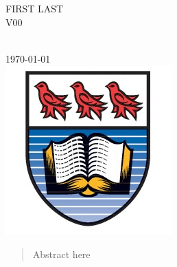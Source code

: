 \documentclass[12pt]{article}
\newcommand*\NewPage{\newpage\null\thispagestyle{empty}\newpage}
\begin{document}
\begin{titlepage}
\begin{minipage}{0.4\textwidth}
\begin{flushright}
			FIRST \textsc{LAST}	\\
			V00	\\
			\end{flushright}
			\end{minipage}\\[1.5cm]






{\large \today}\\[2.5cm] %


\includegraphics{UVic_logo}\\ %
 

\vfill %

\end{titlepage}

\NewPage %



\thispagestyle{empty}
\renewcommand{\abstractname}{Summary}
\begin{abstract}
Abstract here

\end{abstract}
\end{document}
